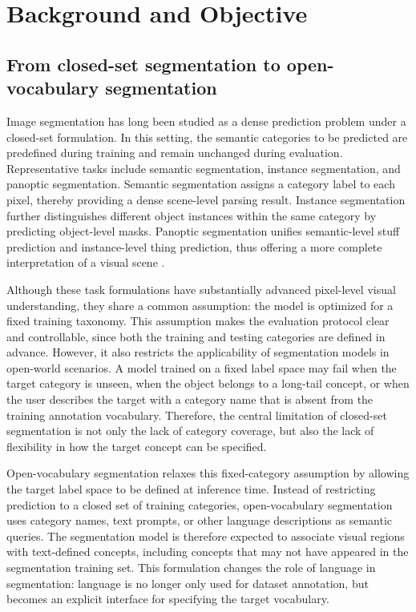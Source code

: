 \section{Background and Objective}
\label{sec:background}

\subsection{From closed-set segmentation to open-vocabulary segmentation}
\label{subsec:closed_to_ovs}

Image segmentation has long been studied as a dense prediction problem under a closed-set formulation. 
In this setting, the semantic categories to be predicted are predefined during training and remain unchanged during evaluation. 
Representative tasks include semantic segmentation, instance segmentation, and panoptic segmentation. 
Semantic segmentation assigns a category label to each pixel, thereby providing a dense scene-level parsing result. 
Instance segmentation further distinguishes different object instances within the same category by predicting object-level masks. 
Panoptic segmentation unifies semantic-level stuff prediction and instance-level thing prediction, thus offering a more complete interpretation of a visual scene \cite{Long2015,He2017,Kirillov2019}.

Although these task formulations have substantially advanced pixel-level visual understanding, they share a common assumption: the model is optimized for a fixed training taxonomy. 
This assumption makes the evaluation protocol clear and controllable, since both the training and testing categories are defined in advance. 
However, it also restricts the applicability of segmentation models in open-world scenarios. 
A model trained on a fixed label space may fail when the target category is unseen, when the object belongs to a long-tail concept, or when the user describes the target with a category name that is absent from the training annotation vocabulary. 
Therefore, the central limitation of closed-set segmentation is not only the lack of category coverage, but also the lack of flexibility in how the target concept can be specified.

Open-vocabulary segmentation relaxes this fixed-category assumption by allowing the target label space to be defined at inference time. 
Instead of restricting prediction to a closed set of training categories, open-vocabulary segmentation uses category names, text prompts, or other language descriptions as semantic queries. 
The segmentation model is therefore expected to associate visual regions with text-defined concepts, including concepts that may not have appeared in the segmentation training set. 
This formulation changes the role of language in segmentation: language is no longer only used for dataset annotation, but becomes an explicit interface for specifying the target vocabulary.


